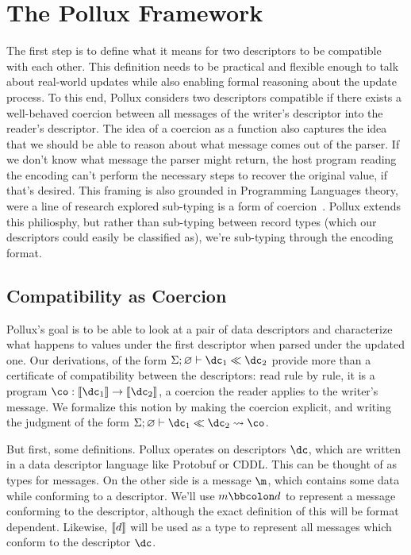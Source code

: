 \section{The Pollux Framework}\label{sec:framework}

The first step is to define what it means for two descriptors to be compatible
with each other. This definition needs to be practical and flexible enough to
talk about real-world updates while also enabling formal reasoning about the
update process. To this end, Pollux considers two descriptors compatible if
there exists a well-behaved coercion between all messages of the writer's
descriptor into the reader's descriptor. The idea of a coercion as a function
also captures the idea that we should be able to reason about what message comes
out of the parser. If we don't know what message the parser might return, the
host program reading the encoding can't perform the necessary steps to recover
the original value, if that's desired. This framing is also grounded in
Programming Languages theory, were a line of research explored sub-typing is a
form of
coercion~\cite{breazu-tannenInheritanceImplicitCoercion1991,brandtCoinductiveAxiomatizationRecursive1998}.
Pollux extends this philiosphy, but rather than sub-typing between record types
(which our descriptors could easily be classified as), we're sub-typing through
the encoding format.

\subsection{Compatibility as Coercion}

Pollux's goal is to be able to look at a pair of data descriptors and
characterize what happens to values under the first descriptor when parsed under
the updated one. Our derivations, of the form
$\judg{\varnothing}{\dc_1 \dcompat \dc_2}$ provide more than a certificate of
compatibility between the descriptors: read rule by rule, it is a program
$\co : \denote{\dc_1} \rightarrow \denote{\dc_2}$, a coercion the reader applies to the
writer's message. We formalize this notion by making the coercion explicit, and
writing the judgment of the form
$\judg{\varnothing}{\dc_1 \dcompat \dc_2 \coerce \co}$.

But first, some definitions. Pollux operates on descriptors $\dc$, which are
written in a data descriptor language like Protobuf or CDDL. This can be thought
of as types for messages. On the other side is a message $\m$, which contains
some data while conforming to a descriptor. We'll use $\validv{m}{d}$ to
represent a message conforming to the descriptor, although the exact definition
of this will be format dependent. Likewise, $\llbracket{} d \rrbracket{}$ will be used as a type
to represent all messages which conform to the descriptor $\dc$.

